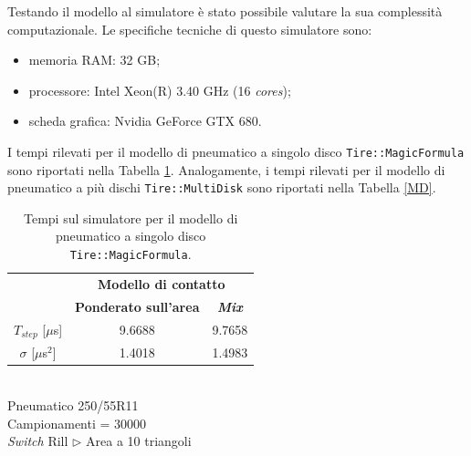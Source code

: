 %
\clearpage
\noindent
Testando il modello al simulatore è stato possibile valutare la sua complessità computazionale. Le specifiche tecniche di questo simulatore sono:
\begin{itemize}
	\item memoria RAM: 32 GB;
	\item processore: Intel Xeon(R) 3.40 GHz (16 \textit{cores});
	\item scheda grafica: Nvidia GeForce GTX 680.
\end{itemize}
I tempi rilevati per il modello di pneumatico a singolo disco \texttt{Tire::MagicFormula} sono riportati nella Tabella \ref{MF}. Analogamente, i tempi rilevati per il modello di pneumatico a più dischi \texttt{Tire::MultiDisk} sono riportati nella Tabella \ref{MD}.
%
\begin{table}
	\centering
	\begin{tabular}{c|c|c|}
		\cline{2-3} 
		& \multicolumn{2}{c|}{\textbf{Modello di contatto}} \\
		\cline{2-3} 
		& \textbf{Ponderato sull'area} & \textbf{\textit{Mix}} \\ 
		\hline
		\multicolumn{1}{|c|}{$T_{step}$ [$\mu$s]} & 9.6688 & 9.7658 \\ 
		\hline 
		\multicolumn{1}{|c|}{$\sigma$ [$\mu$s$^2$]} & 1.4018 & 1.4983 \\ 
		\hline
	\end{tabular}
	\\[0.5cm]
	Pneumatico 250/55R11\\
	Campionamenti = 30000\\
	\textit{Switch} Rill $\triangleright$ Area a 10 triangoli
	\caption{Tempi sul simulatore per il modello di pneumatico a singolo disco \texttt{Tire::MagicFormula}.}
	\label{MF}
\end{table}
%
